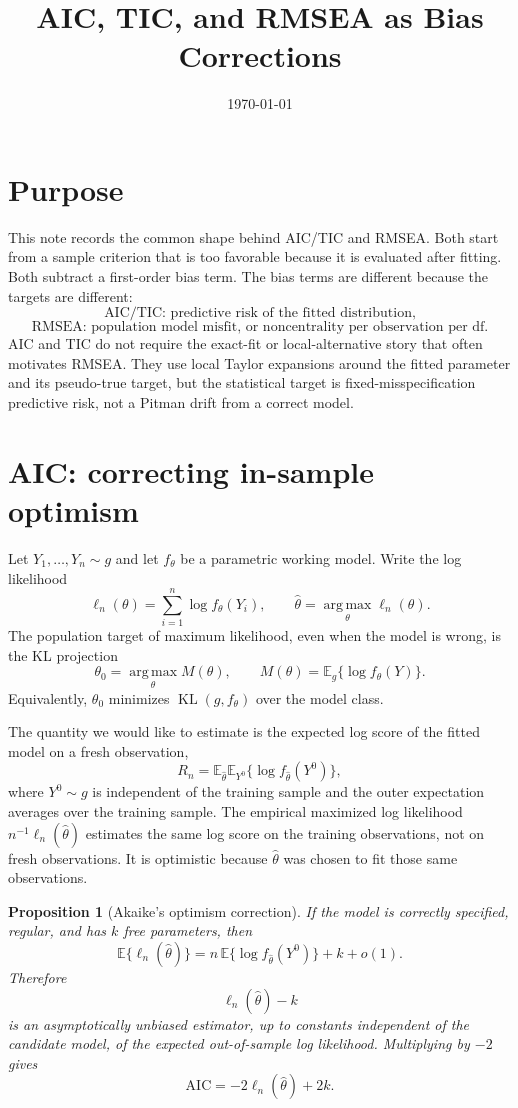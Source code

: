 \documentclass[11pt]{article}
\title{AIC, TIC, and RMSEA as Bias Corrections}
\author{}
\date{\today}
\newcommand{\E}{\mathbb{E}}
\newcommand{\argmax}{\operatorname*{arg\,max}}
\newcommand{\KL}{\operatorname{KL}}
\theoremstyle{plain}
\newtheorem{proposition}{Proposition}
\theoremstyle{remark}
\begin{document}
\maketitle

\section*{Purpose}

This note records the common shape behind AIC/TIC and RMSEA. Both start from a
sample criterion that is too favorable because it is evaluated after fitting.
Both subtract a first-order bias term. The bias terms are different because the
targets are different:
\[
  \text{AIC/TIC: predictive risk of the fitted distribution,}
\]
\[
  \text{RMSEA: population model misfit, or noncentrality per observation per df.}
\]
AIC and TIC do not require the exact-fit or local-alternative story that often
motivates RMSEA. They use local Taylor expansions around the fitted parameter
and its pseudo-true target, but the statistical target is fixed-misspecification
predictive risk, not a Pitman drift from a correct model.

\section{AIC: correcting in-sample optimism}

Let $Y_1,\ldots,Y_n\sim g$ and let $f_\theta$ be a parametric working model.
Write the log likelihood
\[
  \ell_n(\theta)=\sum_{i=1}^n \log f_\theta(Y_i),
  \qquad
  \hat\theta=\argmax_\theta \ell_n(\theta).
\]
The population target of maximum likelihood, even when the model is wrong, is
the KL projection
\[
  \theta_0=\argmax_\theta M(\theta),
  \qquad
  M(\theta)=\E_g\{\log f_\theta(Y)\}.
\]
Equivalently, $\theta_0$ minimizes $\KL(g,f_\theta)$ over the model class.

The quantity we would like to estimate is the expected log score of the fitted
model on a fresh observation,
\[
  R_n = \E_{\hat\theta}\E_{Y^0}\{\log f_{\hat\theta}(Y^0)\},
\]
where $Y^0\sim g$ is independent of the training sample and the outer
expectation averages over the training sample. The empirical maximized log
likelihood $n^{-1}\ell_n(\hat\theta)$ estimates the same log score on the
training observations, not on fresh observations. It is optimistic because
$\hat\theta$ was chosen to fit those same observations.

\begin{proposition}[Akaike's optimism correction]
If the model is correctly specified, regular, and has $k$ free parameters, then
\[
  \E\{\ell_n(\hat\theta)\}
  =
  n\,\E\{\log f_{\hat\theta}(Y^0)\} + k + o(1).
\]
Therefore
\[
  \ell_n(\hat\theta)-k
\]
is an asymptotically unbiased estimator, up to constants independent of the
candidate model, of the expected out-of-sample log likelihood. Multiplying by
$-2$ gives
\[
  \mathrm{AIC}=-2\ell_n(\hat\theta)+2k .
\]
\end{proposition}
\end{document}
